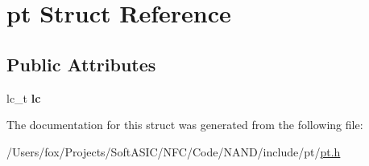 \hypertarget{structpt}{
\section{pt Struct Reference}
\label{structpt}
}
\subsection*{Public Attributes}
\begin{DoxyCompactItemize}
\item 
\hypertarget{structpt_ac3fa0fa86689e3e7c039a16c16861dbe}{
lc\_\-t {\bfseries lc}}
\label{structpt_ac3fa0fa86689e3e7c039a16c16861dbe}

\end{DoxyCompactItemize}


The documentation for this struct was generated from the following file:\begin{DoxyCompactItemize}
\item 
/Users/fox/Projects/SoftASIC/NFC/Code/NAND/include/pt/\hyperlink{pt_8h}{pt.h}\end{DoxyCompactItemize}
